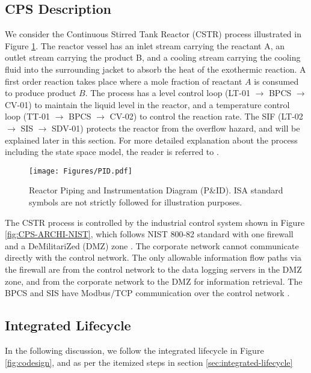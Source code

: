 \documentclass[journal]{IEEEtran}
\begin{document}
\subsection{CPS Description}
We consider the Continuous Stirred Tank Reactor (CSTR) process illustrated in Figure \ref{fig:Reactor P&ID}. The reactor vessel has an inlet stream carrying the reactant A, an outlet stream carrying the product B, and a cooling stream carrying the cooling fluid into the surrounding jacket to absorb the heat of the exothermic reaction. A first order reaction takes place where a mole fraction of reactant $A$ is consumed to produce product $B$. The process has a level control loop (LT-01 $\rightarrow$ BPCS $\rightarrow$ CV-01) to maintain the liquid level in the reactor, and a temperature control loop (TT-01 $\rightarrow$ BPCS $\rightarrow$ CV-02) to control the reaction rate. The SIF (LT-02 $\rightarrow$ SIS $\rightarrow$ SDV-01) protects the reactor from the overflow hazard, and will be explained later in this section. For more detailed explanation about the process including the state space model, the reader is referred to \cite{Tantawy2019CICN}.

\begin{figure}[]
\centering
\texttt{[image: Figures/PID.pdf]}
\caption{Reactor Piping and Instrumentation Diagram (P\&ID). ISA standard symbols are not strictly followed for illustration purposes.}
\label{fig:Reactor P&ID}
\end{figure}

The CSTR process is controlled by the industrial control system shown in Figure \ref{fig:CPS-ARCHI-NIST}, which follows NIST 800-82 standard with one firewall and a DeMilitariZed (DMZ) zone \cite{stouffer2011}. The corporate network cannot communicate directly with the control network. The only allowable information flow paths via the firewall are from the control network to the data logging servers in the DMZ zone, and from the corporate network to the DMZ for information retrieval. The BPCS and SIS have Modbus/TCP communication over the control network \cite{swales1999open}.

\subsection{Integrated Lifecycle}
In the following discussion, we follow the integrated lifecycle in Figure \ref{fig:codesign}, and as per the itemized steps in section \ref{sec:integrated-lifecycle}
\end{document}
